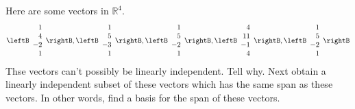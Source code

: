 \begin{enumialphparenastyle}
\begin{ex} Here are some vectors in $\mathbb{R}^{4}$. 
\begin{equation*}
\leftB 
\begin{array}{r}
1 \\ 
4 \\ 
-2 \\ 
1
\end{array}
\rightB ,\leftB 
\begin{array}{r}
1 \\ 
5 \\ 
-3 \\ 
1
\end{array}
\rightB ,\leftB 
\begin{array}{r}
1 \\ 
5 \\ 
-2 \\ 
1
\end{array}
\rightB ,\leftB 
\begin{array}{r}
4 \\ 
11 \\ 
-1 \\ 
4
\end{array}
\rightB ,\leftB 
\begin{array}{r}
1 \\ 
5 \\ 
-2 \\ 
1
\end{array}
\rightB 
\end{equation*}
Thse vectors can't possibly be linearly independent. Tell why. Next obtain a
linearly independent subset of these vectors which has the same span as
these vectors. In other words, find a basis for the span of these vectors.
\end{ex}


\end{enumialphparenastyle}
